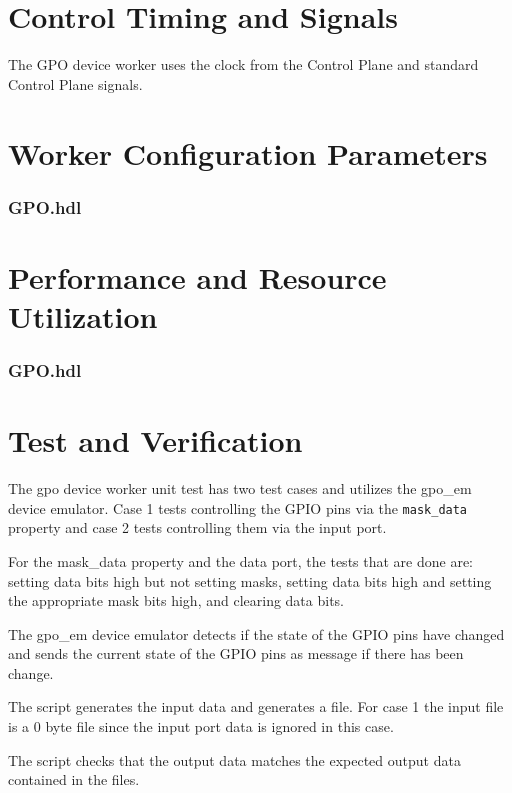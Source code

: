 \documentclass{article}
\def\comp{GPO}
\begin{document}
\section*{Control Timing and Signals}
\begin{flushleft}
The GPO device worker uses the clock from the Control Plane and standard Control Plane signals.
\end{flushleft}

\begin{landscape}
\section*{Worker Configuration Parameters}
\subsubsection*{\comp.hdl}

\section*{Performance and Resource Utilization}
\subsubsection*{\comp.hdl}

\end{landscape}



\section*{Test and Verification}
\normalsize

\begin{flushleft}

The gpo device worker unit test has two test cases and utilizes the gpo\_em device emulator. Case 1 tests controlling the GPIO pins via the \texttt{mask\_data} property and case 2 tests controlling them via the input port. \newline

For the mask\_data property and the data port, the tests that are done are: setting data bits high but not setting masks, setting data bits high and setting the appropriate mask bits high, and clearing data bits.\newline

The gpo\_em device emulator detects if the state of the GPIO pins have changed and sends the current state of the GPIO pins as message if there has been change. \newline

The  script generates the input data and generates a  file. For case 1 the input file is a 0 byte file since the input port data is ignored in this case. \newline

The  script checks that the output data matches the expected output data contained in the  files.

\end{flushleft}
\end{document}
